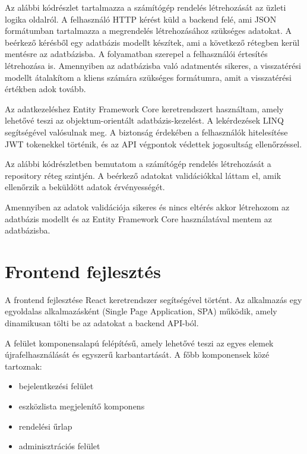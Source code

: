 \documentclass[
]{thesis-ekf}
\theoremstyle{definition}
\theoremstyle{remark}
\begin{document}
Az alábbi kódrészlet tartalmazza a számítógép rendelés létrehozását az üzleti logika oldalról. A felhasználó HTTP kérést küld a backend felé, ami JSON formátumban tartalmazza a megrendelés létrehozásához szükséges adatokat.
A beérkező kérésből egy adatbázis modellt készítek, ami a következő rétegben kerül mentésre az adatbázisba.
A folyamatban szerepel a felhasználói értesítés létrehozása is.
Amennyiben az adatbázisba való adatmentés sikeres, a visszatérési modellt átalakítom a kliens számára szükséges formátumra, amit a visszatérési értékben adok tovább.


Az adatkezeléshez Entity Framework Core keretrendszert használtam, amely lehetővé teszi az objektum-orientált adatbázis-kezelést. A lekérdezések LINQ segítségével valósulnak meg.
A biztonság érdekében a felhasználók hitelesítése JWT tokenekkel történik, és az API végpontok védettek jogosultság ellenőrzéssel.

Az alábbi kódrészletben bemutatom a számítógép rendelés létrehozását a repository réteg szintjén.
A beérkező adatokat validációkkal láttam el, amik ellenőrzik a beküldött adatok érvényességét.


Amennyiben az adatok validációja sikeres és nincs eltérés akkor létrehozom az adatbázis modellt és az Entity Framework Core használatával mentem az adatbázisba.



\section{Frontend fejlesztés}
A frontend fejlesztése React keretrendszer segítségével történt. Az alkalmazás egy egyoldalas alkalmazásként (Single Page Application, SPA) működik, amely dinamikusan tölti be az adatokat a backend API-ból.

A felület komponensalapú felépítésű, amely lehetővé teszi az egyes elemek újrafelhasználását és egyszerű karbantartását. A főbb komponensek közé tartoznak:

\begin{itemize}
	\item bejelentkezési felület
	\item eszközlista megjelenítő komponens
	\item rendelési űrlap
	\item adminisztrációs felület
\end{itemize}
\end{document}
